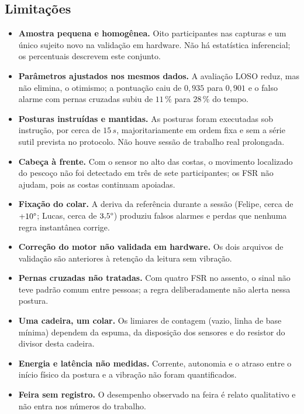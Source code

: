 \subsection{Limitações}
\label{sec:dis-limitacoes}

\begin{itemize}[nosep]
  \item \textbf{Amostra pequena e homogênea.} Oito participantes nas capturas e
        um único sujeito novo na validação em hardware. Não há estatística
        inferencial; os percentuais descrevem este conjunto.
  \item \textbf{Parâmetros ajustados nos mesmos dados.} A avaliação LOSO
        reduz, mas não elimina, o otimismo; a pontuação caiu de $0{,}935$ para
        $0{,}901$ e o falso alarme com pernas cruzadas subiu de $11\,\%$ para
        $28\,\%$ do tempo.
  \item \textbf{Posturas instruídas e mantidas.} As posturas foram executadas
        sob instrução, por cerca de $15\,s$, majoritariamente em ordem fixa e
        sem a série sutil prevista no protocolo. Não houve sessão de trabalho
        real prolongada.
  \item \textbf{Cabeça à frente.} Com o sensor no alto das costas, o movimento
        localizado do pescoço não foi detectado em três de sete participantes;
        os FSR não ajudam, pois as costas continuam apoiadas.
  \item \textbf{Fixação do colar.} A deriva da referência durante a sessão
        (Felipe, cerca de $+10\degree{}$; Lucas, cerca de $3{,}5\degree{}$)
        produziu falsos alarmes e perdas que nenhuma regra instantânea corrige.
  \item \textbf{Correção do motor não validada em hardware.} Os dois arquivos
        de validação são anteriores à retenção da leitura sem vibração.
  \item \textbf{Pernas cruzadas não tratadas.} Com quatro FSR no assento, o
        sinal não teve padrão comum entre pessoas; a regra deliberadamente não
        alerta nessa postura.
  \item \textbf{Uma cadeira, um colar.} Os limiares de contagem (vazio, linha
        de base mínima) dependem da espuma, da disposição dos sensores e do
        resistor do divisor desta cadeira.
  \item \textbf{Energia e latência não medidas.} Corrente, autonomia e o atraso
        entre o início físico da postura e a vibração não foram quantificados.
  \item \textbf{Feira sem registro.} O desempenho observado na feira é relato
        qualitativo e não entra nos números do trabalho.
\end{itemize}
